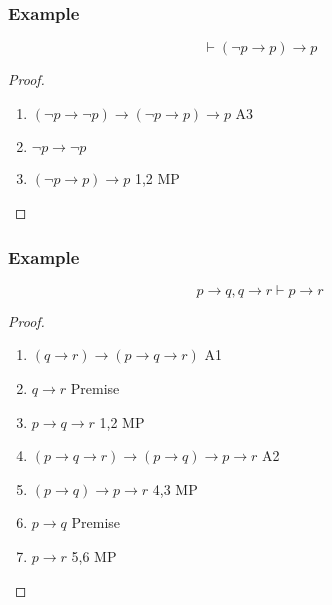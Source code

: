 \documentclass[UTF8,11pt,colorlinks,compress,openany]{beamer}%
\begin{document}
\begin{frame}\frametitle{Example}
	\begin{theorem}
		\[\vdash(\neg p\to p)\to p\]
	\end{theorem}
	\begin{proof}
		\begin{enumerate}
			\item $(\neg p \to\neg p) \to(\neg p \to p) \to p$ \hfill A3
			\item $\neg p \to \neg p$
			\item $(\neg p \to p) \to p$ \hfill 1,2 MP
		\end{enumerate}
	\end{proof}
\end{frame}

\begin{frame}\frametitle{Example}
	\begin{theorem}
		\[p\to q, q \to r\vdash p \to r\]
	\end{theorem}
	\begin{proof} 
		\begin{enumerate}
			\item $(q\to r)\to (p\to q\to r)$ \hfill A1
			\item $q \to r$ \hfill Premise
			\item $p \to q \to r$ \hfill 1,2 MP
			\item $(p \to q \to r) \to (p \to q) \to p \to r$ \hfill A2
			\item $(p \to q) \to p \to r$ \hfill 4,3 MP
			\item $p \to q$ \hfill Premise
			\item $p \to r$ \hfill 5,6 MP
		\end{enumerate}
	\end{proof}
\end{frame}
\end{document}
